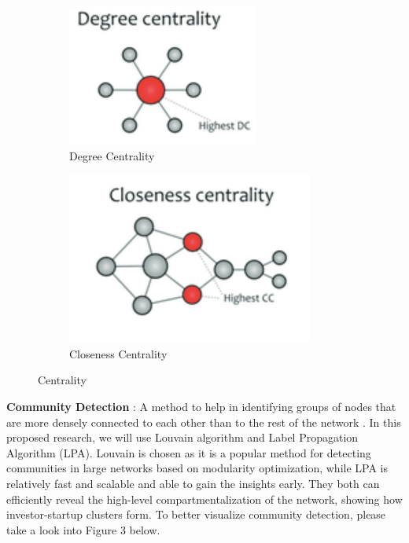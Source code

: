 \documentclass[a4paper,11pt]{article}
\begin{document}
\begin{figure}[ht]
\centering
\begin{subfigure}[b]{0.35\textwidth}
    \includegraphics[width=\textwidth]{Degree.png}
    \caption{Degree Centrality}
    \label{fig:image1}
\end{subfigure}
\hfill
\begin{subfigure}[b]{0.35\textwidth}
    \includegraphics[width=\textwidth]{Closeness.png}
    \caption{Closeness Centrality}
    \label{fig:image2}
\end{subfigure}
\caption{Centrality}
\label{fig:doubleimage}
\end{figure}

\textbf{Community Detection} : A method to help in identifying groups of nodes that are more densely connected to each other than to the rest of the network \cite{rodrigues2019a}. In this proposed research, we will use Louvain algorithm and Label Propagation Algorithm (LPA). Louvain is chosen as it is a popular method for detecting communities in large networks based on modularity optimization, while LPA is relatively fast and scalable and able to gain the insights early. They both can efficiently reveal the high-level compartmentalization of the network, showing how investor-startup clusters form. To better visualize community detection, please take a look into Figure 3 below.
\end{document}
